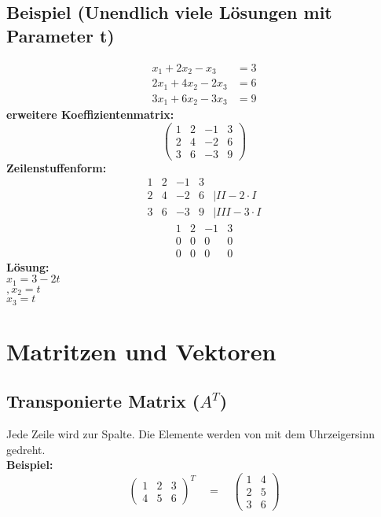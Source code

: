 \documentclass[12pt,a4paper]{article}
\begin{document}
\subsection{Beispiel (Unendlich viele Lösungen mit Parameter t)}
\begin{align*}
    x_1 + 2x_2 - x_3 &= 3 \\
    2x_1 + 4x_2 - 2x_3 &= 6 \\
    3x_1 + 6x_2 - 3x_3 &= 9
\end{align*}
\textbf{erweitere Koeffizientenmatrix:}
\[
\begin{pmatrix}
1 & 2 & -1 & 3 \\
2 & 4 & -2 & 6 \\
3 & 6 & -3 & 9
\end{pmatrix}
\]
\textbf{Zeilenstuffenform:}
\[
\begin{matrix}
1 & 2 & -1 & 3 \\
2 & 4 & -2 & 6 & \vert II - 2 \cdot I\\
3 & 6 & -3 & 9 & \vert III - 3 \cdot I
\end{matrix}
\]
\[
\begin{matrix}
1 & 2 & -1 & 3 \\
0 & 0 & 0 & 0 \\
0 & 0 & 0 & 0
\end{matrix}
\]
\textbf{Lösung:} \\
 $x_1 = 3 - 2t$ \\
$, x_2 = t$ \\
$x_3 = t$

\section{Matritzen und Vektoren}
\subsection{Transponierte Matrix (\texorpdfstring{$A^T$}{A^T})}
Jede Zeile wird zur Spalte. Die Elemente werden von mit dem Uhrzeigersinn gedreht. \\
\textbf{Beispiel:}
\[
\begin{pmatrix}
1 & 2 & 3 \\
4 & 5 & 6
\end{pmatrix}^T
\quad
=
\quad
\begin{pmatrix}
    1 & 4 \\
    2 & 5 \\
    3 & 6
\end{pmatrix}
\]
\end{document}

